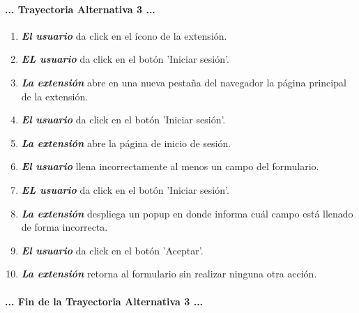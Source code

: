 \documentclass[12pt, a4paper, titlepage]{report}
\begin{document}
			    \paragraph{... Trayectoria Alternativa 3 ...}
				\begin{enumerate}
				
					\item \textbf{\textit{El usuario}} da click en el ícono de la extensión.
					
					\item \textbf{\textit{EL usuario}} da click en el botón 'Iniciar sesión'.
					
					\item \textbf{\textit{La extensión}} abre en una nueva pestaña del navegador la página principal de la extensión.
					
					\item \textbf{\textit{El usuario}} da click en el botón 'Iniciar sesión'.
					
					\item \textbf{\textit{La extensión}} abre la página de inicio de sesión.
					
					\item \textbf{\textit{El usuario}} llena incorrectamente al menos un campo del formulario.
					
					\item \textbf{\textit{EL usuario}} da click en el botón 'Iniciar sesión'.
					
				    \item \textbf{\textit{La extensión}} despliega un popup en donde informa cuál campo está llenado de forma incorrecta.
					
					\item \textbf{\textit{El usuario}} da click en el botón 'Aceptar'.
					
					\item \textbf{\textit{La extensión}} retorna al formulario sin realizar ninguna otra acción.
					
				\end{enumerate}
				\paragraph{... Fin de la Trayectoria Alternativa 3 ...}
				\newpage
			    
\end{document}

